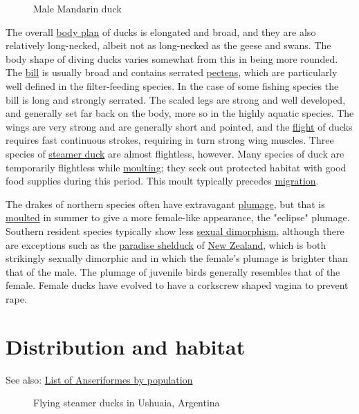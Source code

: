 \documentclass[11pt,a4paper]{article}
\begin{document}
\begin{figure}[h]
\caption{Male Mandarin duck}
\end{figure}

The overall \href{/wiki/Body\_plan}{body plan} of ducks is elongated and broad, and they are also relatively long-necked, albeit not as long-necked as the geese and swans. The body shape of diving ducks varies somewhat from this in being more rounded. The \href{/wiki/Beak}{bill} is usually broad and contains serrated \href{/wiki/Pecten\_\%28biology\%29}{pectens}, which are particularly well defined in the filter-feeding species. In the case of some fishing species the bill is long and strongly serrated. The scaled legs are strong and well developed, and generally set far back on the body, more so in the highly aquatic species. The wings are very strong and are generally short and pointed, and the \href{/wiki/Bird\_flight}{flight} of ducks requires fast continuous strokes, requiring in turn strong wing muscles. Three species of \href{/wiki/Steamer\_duck}{steamer duck} are almost flightless, however. Many species of duck are temporarily flightless while \href{/wiki/Moult}{moulting}; they seek out protected habitat with good food supplies during this period. This moult typically precedes \href{/wiki/Bird\_migration}{migration}.

The drakes of northern species often have extravagant \href{/wiki/Plumage}{plumage}, but that is \href{/wiki/Moult}{moulted} in summer to give a more female-like appearance, the "eclipse" plumage. Southern resident species typically show less \href{/wiki/Sexual\_dimorphism}{sexual dimorphism}, although there are exceptions such as the \href{/wiki/Paradise\_shelduck}{paradise shelduck} of \href{/wiki/New\_Zealand}{New Zealand}, which is both strikingly sexually dimorphic and in which the female's plumage is brighter than that of the male. The plumage of juvenile birds generally resembles that of the female. Female ducks have evolved to have a corkscrew shaped vagina to prevent rape.

\section{Distribution and habitat}

See also: \href{/wiki/List\_of\_Anseriformes\_by\_population}{List of Anseriformes by population}

\begin{figure}[h]
\caption{Flying steamer ducks in Ushuaia, Argentina}
\end{figure}
\end{document}
